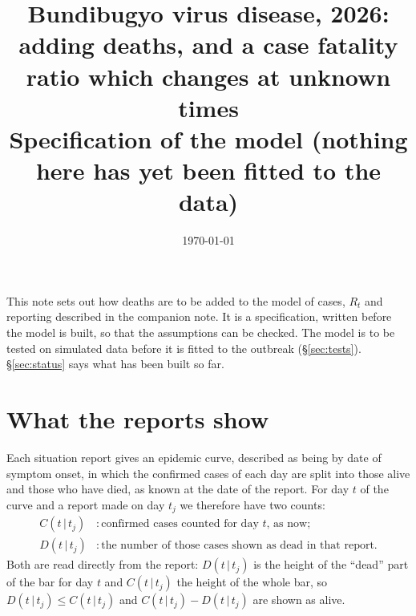 \documentclass[11pt,a4paper]{article}
\title{Bundibugyo virus disease, 2026: adding deaths, and a case fatality
ratio which changes at unknown times\\[4pt]
\large Specification of the model (nothing here has yet been fitted to the data)}
\author{}
\date{\today}
\newcommand{\given}{\,|\,}
\begin{document}
\maketitle

\noindent This note sets out how deaths are to be added to the model of
cases, $R_t$ and reporting described in the companion note. It is a
specification, written before the model is built, so that the assumptions can
be checked. The model is to be tested on simulated data before it is fitted
to the outbreak (\S\ref{sec:tests}). \S\ref{sec:status} says what has been
built so far.

\section{What the reports show}

Each situation report gives an epidemic curve, described as being by date
of symptom onset, in which the confirmed cases of each day are split into
those alive and those who have died, as known at the date of the report. For
day $t$ of the curve and a report made on day $t_j$ we therefore have two
counts:
\begin{align*}
C(t\given t_j) &: \text{confirmed cases counted for day $t$, as now};\\
D(t\given t_j) &: \text{the number of those cases shown as dead in that report}.
\end{align*}
Both are read directly from the report: $D(t\given t_j)$ is the height of
the ``dead'' part of the bar for day $t$ and $C(t\given t_j)$ the
height of the whole bar, so $D(t\given t_j)\le C(t\given t_j)$ and
$C(t\given t_j)-D(t\given t_j)$ are shown as alive. 
\end{document}
